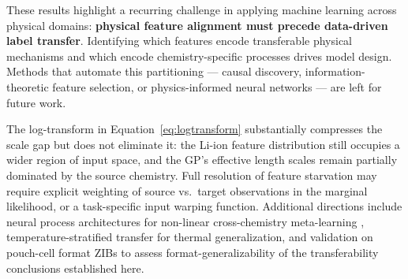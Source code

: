 \documentclass[12pt]{article}
\begin{document}
These results highlight a recurring challenge in applying machine learning across physical domains: \textbf{physical feature alignment must precede data-driven label transfer}. Identifying which features encode transferable physical mechanisms and which encode chemistry-specific processes drives model design. Methods that automate this partitioning --- causal discovery, information-theoretic feature selection, or physics-informed neural networks --- are left for future work.

The log-transform in Equation~\eqref{eq:logtransform} substantially compresses
the scale gap but does not eliminate it: the Li-ion feature distribution still
occupies a wider region of input space, and the GP's effective length scales
remain partially dominated by the source chemistry. Full resolution of feature
starvation may require explicit weighting of source vs.\ target observations in
the marginal likelihood, or a task-specific input warping function. Additional
directions include neural process architectures for non-linear cross-chemistry
meta-learning \cite{weiss2016transfer}, temperature-stratified transfer for thermal generalization, and
validation on pouch-cell format ZIBs to assess format-generalizability of the
transferability conclusions established here.
\end{document}
